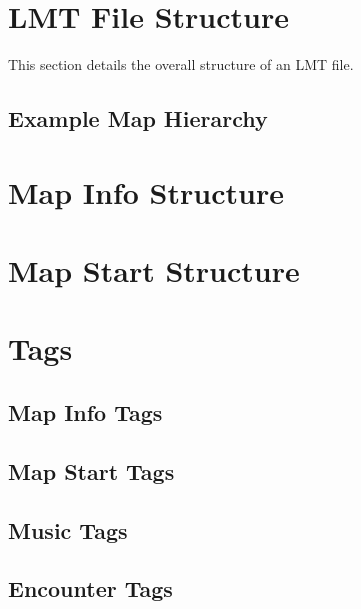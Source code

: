 \section{LMT File Structure}
This section details the overall structure of an LMT file.

\subsection{Example Map Hierarchy}
\section{Map Info Structure}
\section{Map Start Structure}

\section{Tags}
\subsection{Map Info Tags}
\subsection{Map Start Tags}
\subsection{Music Tags}
\subsection{Encounter Tags}


